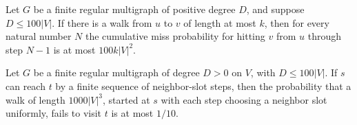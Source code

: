 \begin{theorem}
\label{Randomized.RegularMultigraph.hitTime_le_hundred_mul}
\leanok
{}
Let $G$ be a finite regular multigraph of positive degree $D$, and suppose $D\le
100|V|$. If there is a walk from $u$ to $v$ of length at most $k$, then for every
natural number $N$ the cumulative miss probability for hitting $v$ from $u$ through step
$N-1$ is at most $100k|V|^2$.
\end{theorem}

\begin{theorem}
\label{Randomized.RegularMultigraph.missProb_thousand_mul_pow_three_le}
\leanok
{}
Let $G$ be a finite regular multigraph of degree $D>0$ on $V$, with $D\le 100|V|$. If
$s$ can reach $t$ by a finite sequence of neighbor-slot steps, then the probability that
a walk of length $1000|V|^3$, started at $s$ with each step choosing a neighbor slot
uniformly, fails to visit $t$ is at most $1/10$.
\end{theorem}
